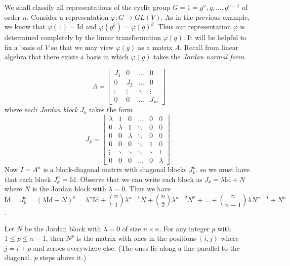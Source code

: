 \begin{example}
We shall classify all representations of the cyclic group $G = {1= g^n, g, \ldots, g^{n-1}}$ of order $n$. Consider a representation $\varphi \colon G \to GL(V)$.  As in the previous example, we know that $\varphi(1) = \text{Id}$ and $\varphi(g^k) = \varphi(g)^k$.  Thus our representation $\varphi$ is determined completely by the linear transformation $\varphi(g)$.   It will be helpful to fix a basis of $V$ so that we may view $\varphi(g)$ as a matrix $A$.  Recall from linear algebra that there exists a basis in which $\varphi(g)$ takes the \textit{Jordan normal form}.

\[ A = \begin{bmatrix}
    J_1 & 0 & \dots  &0 \\
  0 & J_2  & \dots & 0 \\
    \vdots & \vdots  & \ddots & \vdots \\
    0& 0&  \dots  & J_m
\end{bmatrix} \]
where each \textit{Jordan block} $J_k$ takes the form 
\[J_k =  \begin{bmatrix}
    \lambda & 1&0& \dots  &0 & 0 \\
     0 &\lambda& 1& \ddots & 0  & 0 \\
     0 & 0 & \lambda & \ddots& 0  & 0 \\
     0 & 0 & 0 & \ddots & 1 & 0 \\
    \vdots & \ddots & \ddots & \ddots & \ddots  & 1\\
    0& 0& 0 & \dots  & 0  &\lambda
\end{bmatrix}. \]
Now $I = A^n$ is a block-diagonal matrix with diagonal blocks $J_k^n$, so we must have that each block $J_k^n=\text{Id}$.  Observe that we can write each block as $J_k = \lambda \text{Id} + N$ where $N$ is the Jordan block with $\lambda = 0$.  Thus we have 
\[ \text{Id} = J_k^n = (\lambda \text{Id} + N)^n = \lambda ^n \text{Id} + \binom{n}{1} \lambda ^{n -1} N + \binom{n}{2} \lambda ^{n-2} N^2 + \ldots + \binom {n} {n -1} \lambda N^{n -1} + N^n \].  
\begin{lemma}
Let $N$ be the Jordan block with $\lambda = 0$ of size $n \times n$.  For any integer $p$ with $1 \leq p \leq n - 1$, then $N^p$ is the matrix with ones in the positions $(i,j)$ where $j = i + p$ and zeroes everywhere else.  (The ones lie along a line parallel to the diagonal, $p$ steps above it.)


\end{lemma}
\end{example}
